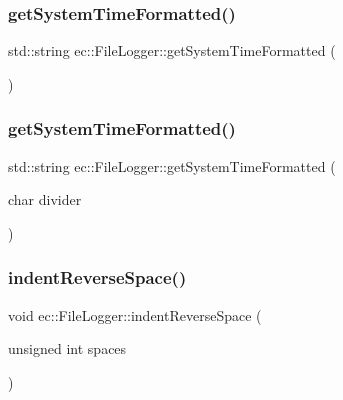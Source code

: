 \subsubsection{\texorpdfstring{get\+System\+Time\+Formatted()}{getSystemTimeFormatted()}\hspace{0.1cm}{\footnotesize\ttfamily [1/2]}}
{\footnotesize\ttfamily std\+::string ec\+::\+File\+Logger\+::get\+System\+Time\+Formatted (\begin{DoxyParamCaption}{ }\end{DoxyParamCaption})\hspace{0.3cm}{\ttfamily [static]}}

\mbox{\label{classec_1_1_file_logger_ada4787b3df30e5c2e493bf15583dd6c1}} 
\subsubsection{\texorpdfstring{get\+System\+Time\+Formatted()}{getSystemTimeFormatted()}\hspace{0.1cm}{\footnotesize\ttfamily [2/2]}}
{\footnotesize\ttfamily std\+::string ec\+::\+File\+Logger\+::get\+System\+Time\+Formatted (\begin{DoxyParamCaption}\item[{char}]{divider }\end{DoxyParamCaption})\hspace{0.3cm}{\ttfamily [static]}}

\mbox{\label{classec_1_1_file_logger_a34e543d95176d0b64f7ad7adcca6d4ae}} 
\subsubsection{\texorpdfstring{indent\+Reverse\+Space()}{indentReverseSpace()}}
{\footnotesize\ttfamily void ec\+::\+File\+Logger\+::indent\+Reverse\+Space (\begin{DoxyParamCaption}\item[{unsigned int}]{spaces }\end{DoxyParamCaption})}

